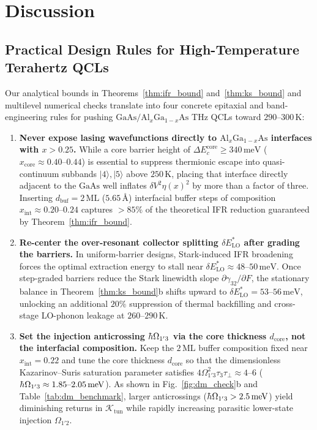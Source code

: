 \documentclass[11pt,letterpaper]{article}
\renewcommand{\hbar}{\mathchar'26\mkern-9mu h}
\begin{document}
\section{Discussion}
\label{sec:discussion}

\subsection{Practical Design Rules for High-Temperature Terahertz QCLs}
\label{subsec:design_rules}

Our analytical bounds in Theorems~\ref{thm:ifr_bound} and~\ref{thm:ks_bound} and multilevel numerical checks translate into four concrete epitaxial and band-engineering rules for pushing $\mathrm{GaAs}/\mathrm{Al}_x\mathrm{Ga}_{1-x}\mathrm{As}$ THz QCLs toward $290\text{--}300\,\mathrm{K}$:
\begin{enumerate}
    \item \textbf{Never expose lasing wavefunctions directly to $\mathrm{Al}_x\mathrm{Ga}_{1-x}\mathrm{As}$ interfaces with $x > 0.25$.} While a core barrier height of $\Delta E_c^{\mathrm{core}} \ge 340\,\mathrm{meV}$ ($x_{\mathrm{core}} \approx 0.40\text{--}0.44$) is essential to suppress thermionic escape into quasi-continuum subbands $|4\rangle, |5\rangle$ above $250\,\mathrm{K}$, placing that interface directly adjacent to the $\mathrm{GaAs}$ well inflates $\delta V^2 \eta(x)^2$ by more than a factor of three. Inserting $d_{\mathrm{buf}} = 2\,\mathrm{ML}$ ($5.65$\,\AA) interfacial buffer steps of composition $x_{\mathrm{int}} \approx 0.20\text{--}0.24$ captures $>85\%$ of the theoretical IFR reduction guaranteed by Theorem~\ref{thm:ifr_bound}.
    \item \textbf{Re-center the over-resonant collector splitting $\delta E_{\mathrm{LO}}^*$ after grading the barriers.} In uniform-barrier designs, Stark-induced IFR broadening forces the optimal extraction energy to stall near $\delta E_{\mathrm{LO}}^* \approx 48\text{--}50\,\mathrm{meV}$. Once step-graded barriers reduce the Stark linewidth slope $\partial\gamma_{32}/\partial F$, the stationary balance in Theorem~\ref{thm:ks_bound}b shifts upward to $\delta E_{\mathrm{LO}}^* = 53\text{--}56\,\mathrm{meV}$, unlocking an additional $20\%$ suppression of thermal backfilling and cross-stage LO-phonon leakage at $260\text{--}290\,\mathrm{K}$.
    \item \textbf{Set the injection anticrossing $\hbar\Omega_{1'3}$ via the core thickness $d_{\mathrm{core}}$, not the interfacial composition.} Keep the $2\,\mathrm{ML}$ buffer composition fixed near $x_{\mathrm{int}} = 0.22$ and tune the core thickness $d_{\mathrm{core}}$ so that the dimensionless Kazarinov--Suris saturation parameter satisfies $4\Omega_{1'3}^2 \tau_3 \tau_\perp \approx 4\text{--}6$ ($\hbar\Omega_{1'3} \approx 1.85\text{--}2.05\,\mathrm{meV}$). As shown in Fig.~\ref{fig:dm_check}b and Table~\ref{tab:dm_benchmark}, larger anticrossings ($\hbar\Omega_{1'3} > 2.5\,\mathrm{meV}$) yield diminishing returns in $\mathcal{K}_{\mathrm{tun}}$ while rapidly increasing parasitic lower-state injection $\Omega_{1'2}$.

\end{enumerate}
\end{document}

